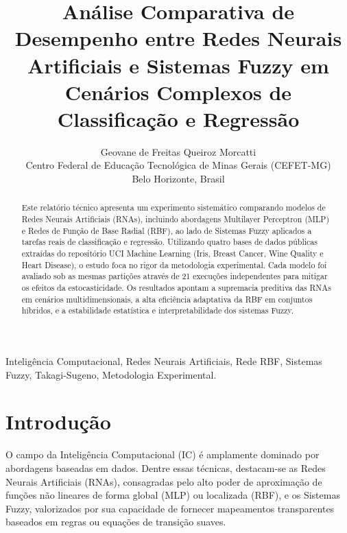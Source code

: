 \documentclass[10pt, journal, compsoc]{IEEEtran}
\begin{document}
\title{Análise Comparativa de Desempenho entre Redes Neurais Artificiais e Sistemas Fuzzy em Cenários Complexos de Classificação e Regressão}

\author{Geovane de Freitas Queiroz Morcatti\\
Centro Federal de Educação Tecnológica de Minas Gerais (CEFET-MG)\\
Belo Horizonte, Brasil}


\maketitle

\begin{abstract}
Este relatório técnico apresenta um experimento sistemático comparando modelos de Redes Neurais Artificiais (RNAs), incluindo abordagens Multilayer Perceptron (MLP) e Redes de Função de Base Radial (RBF), ao lado de Sistemas Fuzzy aplicados a tarefas reais de classificação e regressão. Utilizando quatro bases de dados públicas extraídas do repositório UCI Machine Learning (Iris, Breast Cancer, Wine Quality e Heart Disease), o estudo foca no rigor da metodologia experimental. Cada modelo foi avaliado sob as mesmas partições através de 21 execuções independentes para mitigar os efeitos da estocasticidade. Os resultados apontam a supremacia preditiva das RNAs em cenários multidimensionais, a alta eficiência adaptativa da RBF em conjuntos híbridos, e a estabilidade estatística e interpretabilidade dos sistemas Fuzzy.
\end{abstract}

\begin{IEEEkeywords}
Inteligência Computacional, Redes Neurais Artificiais, Rede RBF, Sistemas Fuzzy, Takagi-Sugeno, Metodologia Experimental.
\end{IEEEkeywords}

\section{Introdução}
O campo da Inteligência Computacional (IC) é amplamente dominado por abordagens baseadas em dados. Dentre essas técnicas, destacam-se as Redes Neurais Artificiais (RNAs), consagradas pelo alto poder de aproximação de funções não lineares de forma global (MLP) ou localizada (RBF), e os Sistemas Fuzzy, valorizados por sua capacidade de fornecer mapeamentos transparentes baseados em regras ou equações de transição suaves.
\end{document}
